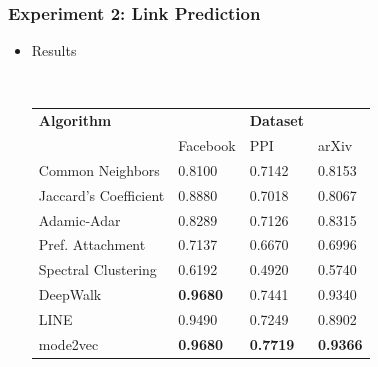 \documentclass[10pt, aspectratio=169]{beamer}
\begin{document}
\begin{frame}
    \frametitle{Experiment 2: Link Prediction}
    \begin{itemize}
        \item Results\par
            ~\\
            \begin{tabular}{llll}
                \toprule
                \textbf{Algorithm} & & \textbf{Dataset} & \\
                             & Facebook & PPI & arXiv \\
                \midrule
                Common Neighbors & 0.8100 & 0.7142 & 0.8153\\
                Jaccard's Coefficient & 0.8880 & 0.7018 & 0.8067\\
                Adamic-Adar & 0.8289 & 0.7126 & 0.8315\\
                Pref. Attachment & 0.7137 & 0.6670 & 0.6996\\
                Spectral Clustering & 0.6192 & 0.4920 & 0.5740\\
                DeepWalk & \textbf{0.9680} & 0.7441 & 0.9340\\
                LINE & 0.9490 & 0.7249 & 0.8902\\
                mode2vec & \textbf{0.9680} & \textbf{0.7719} & \textbf{0.9366}\\
                \bottomrule
            \end{tabular}
    \end{itemize}
\end{frame}
\end{document}
